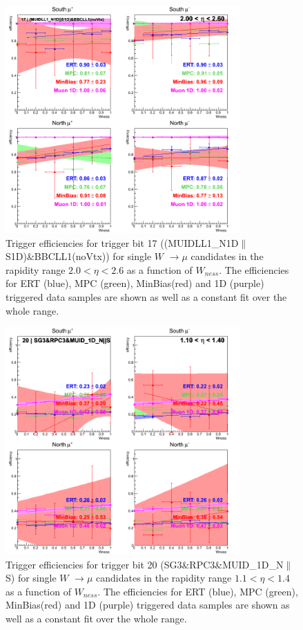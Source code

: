 \begin{figure}[ht]
\begin{center}
\includegraphics[width=0.8\textwidth]{./figures/run13_trigeffisn_eta2_trig17_lin.png}
\caption{\label{fig:run13_trigeffisn_eta2_nper0_trig17_lin} Trigger efficiencies for trigger bit 17 ((MUIDLL1\_N1D$\|$S1D)\&BBCLL1(noVtx)) for single $W$ $\rightarrow \mu$ candidates in the rapidity range $ 2.0 < \eta < 2.6$ as a function of $W_{ness}$. The efficiencies for ERT (blue), MPC (green), MinBias(red) and 1D (purple) triggered data samples are shown as well as a constant fit over the whole range.}
\end{center}
\end{figure}
\begin{figure}[ht]
\begin{center}
\includegraphics[width=0.8\textwidth]{./figures/run13_trigeffisn_eta0_trig20_lin.png}
\caption{\label{fig:run13_trigeffisn_eta0_nper0_trig20_lin} Trigger efficiencies for trigger bit 20 (SG3\&RPC3\&MUID\_1D\_N$\|$S) for single $W$ $\rightarrow \mu$ candidates in the rapidity range $ 1.1 < \eta < 1.4$ as a function of $W_{ness}$. The efficiencies for ERT (blue), MPC (green), MinBias(red) and 1D (purple) triggered data samples are shown as well as a constant fit over the whole range.}
\end{center}
\end{figure}
